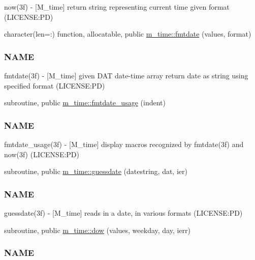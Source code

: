 \begin{DoxyCompactItemize}
\begin{DoxyCompactList}
now(3f) -\/ \mbox{[}M\+\_\+time\mbox{]} return string representing current time given format (L\+I\+C\+E\+N\+SE\+:PD) \end{DoxyCompactList}\item 
character(len=\+:) function, allocatable, public \mbox{\hyperlink{namespacem__time_a2cb84c9b8af4f395b76aed76e1431328}{m\+\_\+time\+::fmtdate}} (values, format)
\begin{DoxyCompactList}\small\item\em \subsubsection*{N\+A\+ME}

fmtdate(3f) -\/ \mbox{[}M\+\_\+time\mbox{]} given D\+AT date-\/time array return date as string using specified format (L\+I\+C\+E\+N\+SE\+:PD) \end{DoxyCompactList}\item 
subroutine, public \mbox{\hyperlink{namespacem__time_a914927f70fb9495af1be2e484b967111}{m\+\_\+time\+::fmtdate\+\_\+usage}} (indent)
\begin{DoxyCompactList}\small\item\em \subsubsection*{N\+A\+ME}

fmtdate\+\_\+usage(3f) -\/ \mbox{[}M\+\_\+time\mbox{]} display macros recognized by fmtdate(3f) and now(3f) (L\+I\+C\+E\+N\+SE\+:PD) \end{DoxyCompactList}\item 
subroutine, public \mbox{\hyperlink{namespacem__time_aa5198c7aa4f3d8411c8ce93046ce3794}{m\+\_\+time\+::guessdate}} (datestring, dat, ier)
\begin{DoxyCompactList}\small\item\em \subsubsection*{N\+A\+ME}

guessdate(3f) -\/ \mbox{[}M\+\_\+time\mbox{]} reads in a date, in various formats (L\+I\+C\+E\+N\+SE\+:PD) \end{DoxyCompactList}\item 
subroutine, public \mbox{\hyperlink{namespacem__time_adfda8a89820b8d0ad4581a14896e4ce5}{m\+\_\+time\+::dow}} (values, weekday, day, ierr)
\begin{DoxyCompactList}\small\item\em \subsubsection*{N\+A\+ME}


\end{DoxyCompactList}
\end{DoxyCompactItemize}
